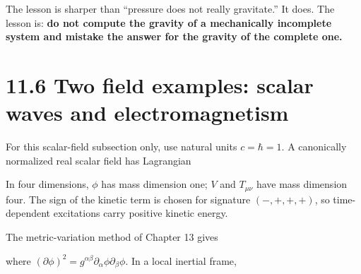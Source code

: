 \documentclass[
  11pt,
  letterpaper,
  oneside,
  openany]{scrbook}
\begin{document}
The lesson is sharper than ``pressure does not really gravitate.'' It
does. The lesson is: \textbf{do not compute the gravity of a
mechanically incomplete system and mistake the answer for the gravity of
the complete one.}

\hypertarget{two-field-examples-scalar-waves-and-electromagnetism}{%
\section{11.6 Two field examples: scalar waves and
electromagnetism}\label{two-field-examples-scalar-waves-and-electromagnetism}}

For this scalar-field subsection only, use natural units \(c=\hbar=1\).
A canonically normalized real scalar field has Lagrangian

\begin{center}
\begingroup
{}
\ifdim\wd\grmathbox>\linewidth
\resizebox{\linewidth}{!}{\usebox{\grmathbox}}
\else\usebox{\grmathbox}\fi
\endgroup
\end{center}

In four dimensions, \(\phi\) has mass dimension one; \(V\) and
\(T_{\mu\nu}\) have mass dimension four. The sign of the kinetic term is
chosen for signature \((-,+,+,+)\), so time-dependent excitations carry
positive kinetic energy.

The metric-variation method of Chapter 13 gives

\begin{center}
\begingroup
{}
\ifdim\wd\grmathbox>\linewidth
\resizebox{\linewidth}{!}{\usebox{\grmathbox}}
\else\usebox{\grmathbox}\fi
\endgroup
\end{center}

where
\((\partial\phi)^2=g^{\alpha\beta}\partial_\alpha\phi\partial_\beta\phi\).
In a local inertial frame,

\begin{center}
\begingroup
{}
\ifdim\wd\grmathbox>\linewidth
\resizebox{\linewidth}{!}{\usebox{\grmathbox}}
\else\usebox{\grmathbox}\fi
\endgroup
\end{center}
\end{document}
